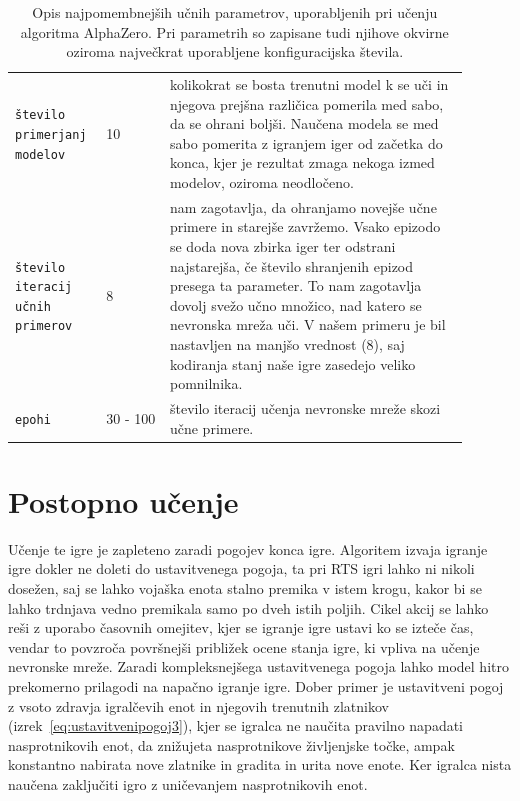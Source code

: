 \documentclass[a4paper, 12pt]{book}
\begin{document}
\begin{table}
	\begin{center}
		\begin{tabular}{p{0.16\linewidth}|p{0.13\linewidth}|p{0.61\linewidth}}

			{\tt število primerjanj modelov}  		  & 10 						& kolikokrat se bosta trenutni model k se uči in njegova prejšna različica pomerila med sabo, da se ohrani boljši.
																				  Naučena modela se med sabo pomerita z igranjem iger od začetka do konca, kjer je rezultat zmaga nekoga izmed modelov, oziroma neodločeno.\\
			{\tt število iteracij učnih primerov}     & 8 						& nam zagotavlja, da ohranjamo novejše učne primere in starejše zavržemo.
																				  Vsako epizodo se doda nova zbirka iger ter odstrani najstarejša, če število shranjenih epizod presega ta parameter.
																				  To nam zagotavlja dovolj svežo učno množico, nad katero se nevronska mreža uči.
																				  V našem primeru je bil nastavljen na manjšo vrednost (8), saj kodiranja stanj naše igre zasedejo veliko pomnilnika.\\
			{\tt epohi}     						  & 30 - 100 				& število iteracij učenja nevronske mreže skozi učne primere.\\
		\end{tabular}
	\end{center}
	\caption{Opis najpomembnejših učnih parametrov, uporabljenih pri učenju algoritma AlphaZero. Pri parametrih so zapisane tudi njihove okvirne oziroma največkrat uporabljene konfiguracijska števila.}
	\label{tableParameters2}
\end{table}

\section{Postopno učenje}
Učenje te igre je zapleteno zaradi pogojev konca igre. 
Algoritem izvaja igranje igre dokler ne doleti do ustavitvenega pogoja, ta pri RTS igri lahko ni nikoli dosežen, saj se lahko vojaška enota stalno premika v istem krogu, kakor bi se lahko trdnjava vedno premikala samo po dveh istih poljih.
Cikel akcij se lahko reši z uporabo časovnih omejitev, kjer se igranje igre ustavi ko se izteče čas, vendar to povzroča površnejši približek ocene stanja igre, ki vpliva na učenje nevronske mreže.
Zaradi kompleksnejšega ustavitvenega pogoja lahko model hitro prekomerno prilagodi na napačno igranje igre.
Dober primer je ustavitveni pogoj z vsoto zdravja igralčevih enot in njegovih trenutnih zlatnikov (izrek~\ref{eq:ustavitvenipogoj3}), kjer se igralca ne naučita pravilno napadati nasprotnikovih enot, da znižujeta nasprotnikove življenjske točke, ampak konstantno nabirata nove zlatnike in gradita in urita nove enote.
Ker igralca nista naučena zaključiti igro z uničevanjem nasprotnikovih enot.
\end{document}
